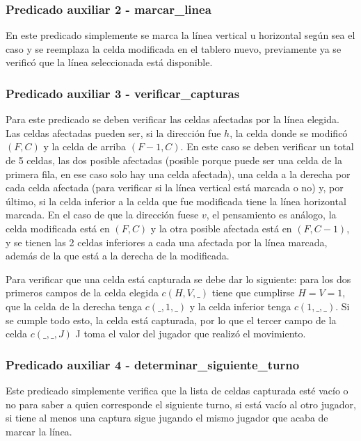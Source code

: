\documentclass[12pt]{article} %
\begin{document}
			\subsubsection{Predicado auxiliar 2 - marcar\_linea}
			En este predicado simplemente se marca la línea vertical u horizontal según sea el caso y se reemplaza la celda modificada en el tablero nuevo, previamente ya se verificó que la línea seleccionada está disponible.
			
			\subsubsection{Predicado auxiliar 3 - verificar\_capturas}
			Para este predicado se deben verificar las celdas afectadas por la línea elegida. Las celdas afectadas pueden ser, si la dirección fue $h$, la celda donde se modificó $(F,C)$ y la celda de arriba $(F-1,C)$. En este caso se deben verificar un total de 5 celdas, las dos posible afectadas (posible porque puede ser una celda de la primera fila, en ese caso solo hay una celda afectada), una celda a la derecha por cada celda afectada (para verificar si la línea vertical está marcada o no) y, por último, si la celda inferior a la celda que fue modificada tiene la línea horizontal marcada. En el caso de que la dirección fuese $v$, el pensamiento es análogo, la celda modificada está en $(F,C)$ y la otra posible afectada está en $(F, C-1)$, y se tienen las 2 celdas inferiores a cada una afectada por la línea marcada, además de la que está a la derecha de la modificada.
			
			Para verificar que una celda está capturada se debe dar lo siguiente: para los dos primeros campos de la celda elegida $c(H,V,\_)$ tiene que cumplirse $H=V=1$, que la celda de la derecha tenga $c(\_,1,\_)$ y la celda inferior tenga $c(1,\_,\_)$. Si se cumple todo esto, la celda está capturada, por lo que el tercer campo de la celda $c(\_,\_,J)$ J toma el valor del jugador que realizó el movimiento.
			
			\subsubsection{Predicado auxiliar 4 - determinar\_siguiente\_turno}
			Este predicado simplemente verifica que la lista de celdas capturada esté vacío o no para saber a quien corresponde el siguiente turno, si está vacío al otro jugador, si tiene al menos una captura sigue jugando el mismo jugador que acaba de marcar la línea.
			
\end{document}
